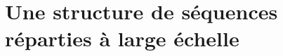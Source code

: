 
\chapter{Une structure de séquences réparties à large échelle}
\label{repl:chap:lseq}
\minitoc







% 

% 










